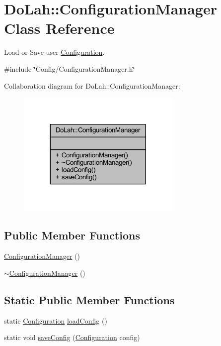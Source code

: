 \hypertarget{class_do_lah_1_1_configuration_manager}{}\section{Do\+Lah\+:\+:Configuration\+Manager Class Reference}
\label{class_do_lah_1_1_configuration_manager}


Load or Save user \hyperlink{class_do_lah_1_1_configuration}{Configuration}.  




{\ttfamily \#include \char`\"{}Config/\+Configuration\+Manager.\+h\char`\"{}}



Collaboration diagram for Do\+Lah\+:\+:Configuration\+Manager\+:\nopagebreak
\begin{figure}[H]
\begin{center}
\leavevmode
\includegraphics[width=224pt]{class_do_lah_1_1_configuration_manager__coll__graph}
\end{center}
\end{figure}
\subsection*{Public Member Functions}
\begin{DoxyCompactItemize}
\item 
\hyperlink{class_do_lah_1_1_configuration_manager_a3cb321309e0f99515f64e5fd4568b3f2}{Configuration\+Manager} ()
\item 
\hyperlink{class_do_lah_1_1_configuration_manager_ace07626580f75f8d5352136b2bf7a714}{$\sim$\+Configuration\+Manager} ()
\end{DoxyCompactItemize}
\subsection*{Static Public Member Functions}
\begin{DoxyCompactItemize}
\item 
static \hyperlink{class_do_lah_1_1_configuration}{Configuration} \hyperlink{class_do_lah_1_1_configuration_manager_a9300119cfdd91ce46629d800b8c486fb}{load\+Config} ()
\item 
static void \hyperlink{class_do_lah_1_1_configuration_manager_aa5fabc3c1fd663d0a310958372c48953}{save\+Config} (\hyperlink{class_do_lah_1_1_configuration}{Configuration} config)
\end{DoxyCompactItemize}


